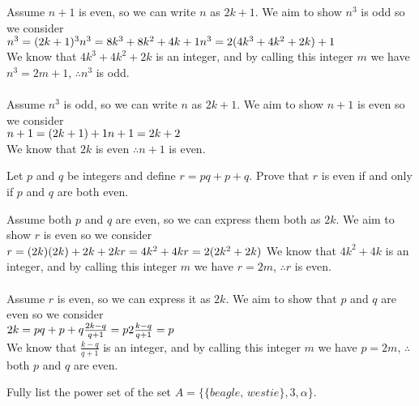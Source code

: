 \documentclass[11pt]{amsart}
\begin{document}
	\begin{sol}
	Assume $n+1$ is even, so we can write $n$ as $2k+1$. We aim to show $n^3$ is odd so we consider\\
	$n^3 = (2k+1)^3\\
	n^3 = 8k^3 + 8k^2 + 4k + 1\\
	n^3 = 2(4k^3 + 4k^2 + 2k) + 1$\\
	We know that $4k^3 + 4k^2 + 2k$ is an integer, and by calling this integer $m$ we have $n^3 = 2m + 1$, $\therefore n^3$ is odd.\\\\
	Assume $n^3$ is odd, so we can write $n$ as $2k+1$. We aim to show $n+1$ is even so we consider\\
	$n+1 = (2k+1) + 1\\
	n+1 = 2k + 2$\\
	We know that $2k$ is even $\therefore n+1$ is even.
	\end{sol}

\item Let $p$ and $q$ be integers and define $r= pq+p+q$.  Prove that $r$ is even if and only if $p$ and $q$ are both even.

\begin{sol}
	Assume both $p$ and $q$ are even, so we can express them both as $2k$. We aim to show $r$ is even so we consider\\
	$r = (2k)(2k) + 2k + 2k\\
	r = 4k^2 + 4k\\
	r = 2(2k^2 + 2k)$
	We know that $4k^2 + 4k$ is an integer, and by calling this integer $m$ we have $r = 2m$, $\therefore r$ is even.\\\\
	Assume $r$ is even, so we can express it as $2k$. We aim to show that $p$ and $q$ are even so we consider\\
	$2k = pq + p + q\\
	\frac{2k-q}{q+1} = p\\
	2 \frac{k-q}{q+1} = p$\\
	We know that $\frac{k-q}{q+1}$ is an integer, and by calling this integer $m$ we have $p = 2m$, $\therefore$ both $p$ and $q$ are even.
\end{sol}


\item Fully list the power set of the set $A= \{\{beagle, \, westie\}, 3, \alpha\}.$
\end{document}
